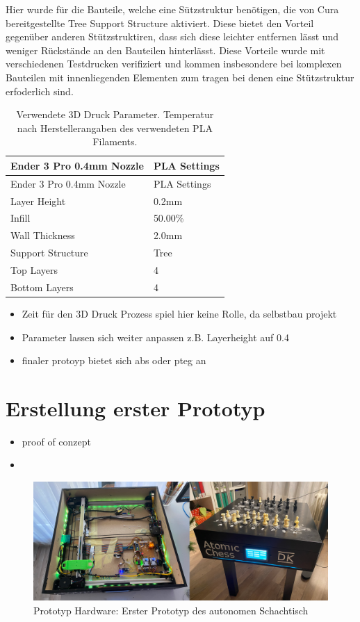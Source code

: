 Hier wurde für die Bauteile, welche eine Sützstruktur benötigen, die von
Cura bereitgestellte Tree Support Structure aktiviert. Diese bietet den
Vorteil gegenüber anderen Stützstruktiren, dass sich diese leichter
entfernen lässt und weniger Rückstände an den Bauteilen hinterlässt.
Diese Vorteile wurde mit verschiedenen Testdrucken verifiziert und
kommen insbesondere bei komplexen Bauteilen mit innenliegenden Elementen
zum tragen bei denen eine Stützstruktur erfoderlich sind.

\begin{longtable}[]{@{}ll@{}}
\caption{Verwendete 3D Druck Parameter. Temperatur nach
Herstellerangaben des verwendeten PLA Filaments.}\tabularnewline
\toprule
Ender 3 Pro 0.4mm Nozzle & PLA Settings\tabularnewline
\midrule
\endfirsthead
\toprule
Ender 3 Pro 0.4mm Nozzle & PLA Settings\tabularnewline
\midrule
\endhead
Layer Height & 0.2mm\tabularnewline
Infill & 50.00\%\tabularnewline
Wall Thickness & 2.0mm\tabularnewline
Support Structure & Tree\tabularnewline
Top Layers & 4\tabularnewline
Bottom Layers & 4\tabularnewline
\bottomrule
\end{longtable}

\begin{itemize}
\tightlist
\item
  Zeit für den 3D Druck Prozess spiel hier keine Rolle, da selbstbau
  projekt
\item
  Parameter lassen sich weiter anpassen z.B. Layerheight auf 0.4
\item
  finaler protoyp bietet sich abs oder pteg an
\end{itemize}

\hypertarget{erstellung-erster-prototyp}{%
\section{Erstellung erster Prototyp}\label{erstellung-erster-prototyp}}

\begin{itemize}
\item
  proof of conzept
\item
\end{itemize}

\begin{figure}
\centering
\includegraphics{images/table_images/dk.png}
\caption{Prototyp Hardware: Erster Prototyp des autonomen Schachtisch}
\end{figure}

